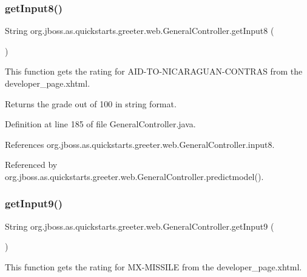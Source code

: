 \subsubsection{\texorpdfstring{get\+Input8()}{getInput8()}}
{\footnotesize\ttfamily String org.\+jboss.\+as.\+quickstarts.\+greeter.\+web.\+General\+Controller.\+get\+Input8 (\begin{DoxyParamCaption}{ }\end{DoxyParamCaption})}



This function gets the rating for A\+I\+D-\/\+T\+O-\/\+N\+I\+C\+A\+R\+A\+G\+U\+A\+N-\/\+C\+O\+N\+T\+R\+AS from the developer\+\_\+page.\+xhtml. 

\begin{DoxyReturn}{Returns}
the grade out of 100 in string format. 
\end{DoxyReturn}


Definition at line 185 of file General\+Controller.\+java.



References org.\+jboss.\+as.\+quickstarts.\+greeter.\+web.\+General\+Controller.\+input8.



Referenced by org.\+jboss.\+as.\+quickstarts.\+greeter.\+web.\+General\+Controller.\+predictmodel().

\mbox{\label{classorg_1_1jboss_1_1as_1_1quickstarts_1_1greeter_1_1web_1_1_general_controller_a46c49abfded9d88cc4a214f861363057}} 
\subsubsection{\texorpdfstring{get\+Input9()}{getInput9()}}
{\footnotesize\ttfamily String org.\+jboss.\+as.\+quickstarts.\+greeter.\+web.\+General\+Controller.\+get\+Input9 (\begin{DoxyParamCaption}{ }\end{DoxyParamCaption})}



This function gets the rating for M\+X-\/\+M\+I\+S\+S\+I\+LE from the developer\+\_\+page.\+xhtml. 

